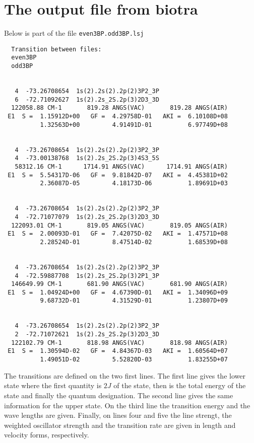 \documentclass[fleqn,10pt]{book}
\begin{document}
\section{The output file from biotra}
Below is part of the file \verb+even3BP.odd3BP.lsj+
\begin{verbatim}
  Transition between files:                                                                                                                                                                   
  even3BP    
  odd3BP    


   4  -73.26708654  1s(2).2s(2).2p(2)3P2_3P    
   6  -72.71092627  1s(2).2s_2S.2p(3)2D3_3D    
  122058.88 CM-1       819.28 ANGS(VAC)       819.28 ANGS(AIR)
 E1  S =  1.15912D+00   GF =  4.29758D-01   AKI =  6.10108D+08
          1.32563D+00         4.91491D-01          6.97749D+08


   4  -73.26708654  1s(2).2s(2).2p(2)3P2_3P    
   4  -73.00138768  1s(2).2s_2S.2p(3)4S3_5S    
   58312.16 CM-1      1714.91 ANGS(VAC)      1714.91 ANGS(AIR)
 E1  S =  5.54317D-06   GF =  9.81842D-07   AKI =  4.45381D+02
          2.36087D-05         4.18173D-06          1.89691D+03


   4  -73.26708654  1s(2).2s(2).2p(2)3P2_3P    
   4  -72.71077079  1s(2).2s_2S.2p(3)2D3_3D    
  122093.01 CM-1       819.05 ANGS(VAC)       819.05 ANGS(AIR)
 E1  S =  2.00093D-01   GF =  7.42075D-02   AKI =  1.47571D+08
          2.28524D-01         8.47514D-02          1.68539D+08


   4  -73.26708654  1s(2).2s(2).2p(2)3P2_3P    
   4  -72.59887708  1s(2).2s_2S.2p(3)2P1_3P    
  146649.99 CM-1       681.90 ANGS(VAC)       681.90 ANGS(AIR)
 E1  S =  1.04924D+00   GF =  4.67390D-01   AKI =  1.34096D+09
          9.68732D-01         4.31529D-01          1.23807D+09


   4  -73.26708654  1s(2).2s(2).2p(2)3P2_3P    
   2  -72.71072621  1s(2).2s_2S.2p(3)2D3_3D    
  122102.79 CM-1       818.98 ANGS(VAC)       818.98 ANGS(AIR)
 E1  S =  1.30594D-02   GF =  4.84367D-03   AKI =  1.60564D+07
          1.49051D-02         5.52820D-03          1.83255D+07
\end{verbatim}
The transitions are defined on the two first lines. 
The first line gives the lower state where the first quantity is $2J$ of the state, then is the total energy of the state and finally the quantum designation. The second line gives the same information for the upper state. On the third line the transition energy and the wave lengths are given. Finally, on lines four and five the line strengt, the weighted oscillator strength and the transition rate are given in length and velocity forms, respectively. 
\end{document}
